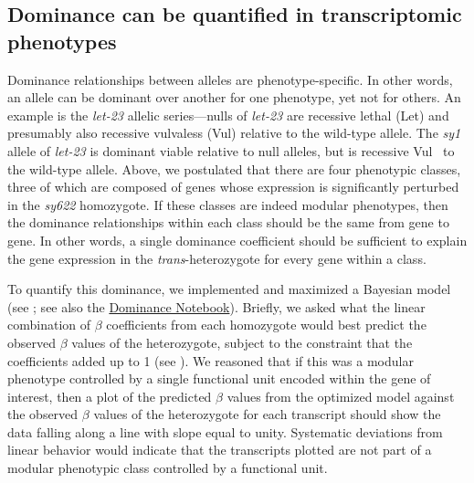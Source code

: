 \documentclass[10pt, twocolumn]{article}
\newcommand{\gene}[1]{\mbox{\emph{#1}}}
\begin{document}
\subsection*{Dominance can be quantified in transcriptomic phenotypes}
Dominance relationships between alleles are phenotype-specific. In other words,
an allele can be dominant over another for one phenotype, yet not for others. An
example is the \gene{let-23} allelic series---nulls of \gene{let-23} are
recessive lethal (Let) and presumably also recessive vulvaless (Vul) relative to
the wild-type allele. The \emph{sy1} allele of \gene{let-23} is dominant viable
relative to null alleles, but is recessive Vul~\cite{Aroian1991} to the
wild-type allele. Above, we postulated that there are four phenotypic classes,
three of which are composed of genes whose expression is significantly perturbed
in the \emph{sy622} homozygote. If these classes are indeed modular phenotypes,
then the dominance relationships within each class should be the same from gene
to gene. In other words, a single dominance coefficient should be sufficient to
explain the gene expression in the \emph{trans}-heterozygote for every gene
within a class.

To quantify this dominance, we implemented and maximized a Bayesian model (see
; see also the
\href{https://wormlabcaltech.github.io/med-cafe/notebook/dominance.html}{Dominance
Notebook}). Briefly, we asked what the linear combination of $\beta$
coefficients from each homozygote would best predict the observed $\beta$ values
of the heterozygote, subject to the constraint that the coefficients added up to
1 (see ). We reasoned that if this was a modular
phenotype controlled by a single functional unit encoded within the gene of
interest, then a plot of the predicted $\beta$ values from the optimized model
against the observed $\beta$ values of the heterozygote for each transcript
should show the data falling along a line with slope equal to unity. Systematic
deviations from linear behavior would indicate that the transcripts plotted are
not part of a modular phenotypic class controlled by a functional unit.
\end{document}
